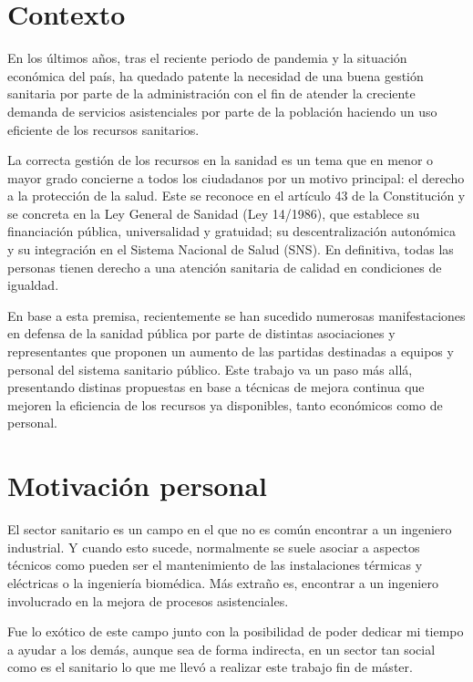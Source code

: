 \section{Contexto}

En los últimos años, tras el reciente periodo de pandemia y la situación económica del país, ha quedado patente la necesidad de una buena gestión sanitaria por parte de la administración con el fin de atender la creciente demanda de servicios asistenciales por parte de la población haciendo un uso eficiente de los recursos sanitarios.

La correcta gestión de los recursos en la sanidad es un tema que en menor o mayor grado concierne a todos los ciudadanos por un motivo principal: el derecho a la protección de la salud. Este se reconoce en el artículo 43 de la Constitución y se concreta en la Ley General de Sanidad (Ley 14/1986), que establece su financiación pública, universalidad y gratuidad; su descentralización autonómica y su integración en el Sistema Nacional de Salud (SNS). En definitiva, todas las personas tienen derecho a una atención sanitaria de calidad en condiciones de igualdad.

En base a esta premisa, recientemente se han sucedido numerosas manifestaciones en defensa de la sanidad pública por parte de distintas asociaciones y representantes que proponen un aumento de las partidas destinadas a equipos y personal del sistema sanitario público. Este trabajo va un paso más allá, presentando distinas propuestas en base a técnicas de mejora continua que mejoren la eficiencia de los recursos ya disponibles, tanto económicos como de personal.

\section{Motivación personal}

El sector sanitario es un campo en el que no es común encontrar a un ingeniero industrial. Y cuando esto sucede, normalmente se suele asociar a aspectos técnicos como pueden ser el mantenimiento de las instalaciones térmicas y eléctricas o la ingeniería biomédica. Más extraño es, encontrar a un ingeniero involucrado en la mejora de procesos asistenciales.

Fue lo exótico de este campo junto con la posibilidad de poder dedicar mi tiempo a ayudar a los demás, aunque sea de forma indirecta, en un sector tan social como es el sanitario lo que me llevó a realizar este trabajo fin de máster.

